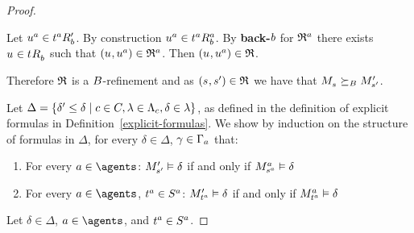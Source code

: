 \begin{proof}
\begin{description}
\begin{description}
                Let $\kStateU[\agentA] \in \kSuccessorsPB{\kStateT[\agentA]}$.
                By construction $\kStateU[\agentA] \in \kSuccessorsB[\agentA]{\kStateT[\agentA]}$.
                By {\bf back-$\agentB$} for $\refinement^\agentA$ there exists $\kStateU \in \kSuccessorsB{\kStateT}$ such that $(\kStateU, \kStateU[\agentA]) \in \refinement^\agentA$.
                Then $(\kStateU, \kStateU[\agentA]) \in \refinement$.
        \end{description}
\end{description}

Therefore $\refinement$ is a $\agentsB$-refinement and as $(\kStateS, \kStateSP) \in \refinement$ we have that $\kPModel{\kStateS} \simulatesBs \kPModelP{\kStateSP}$.

Let $\Delta = \{\delta' \leq \delta \mid \agentC \in \agentsC, \lambda \in \Lambda_\agentC, \delta \in \lambda\}$, as defined in the definition of explicit formulas in Definition~\ref{explicit-formulas}.
We show by induction on the structure of formulas in $\Delta$, for every $\delta \in \Delta$, $\gamma \in \Gamma_\agentA$ that:
\begin{enumerate}
    \item For every $\agentA \in \agents$: $\kPModelP{\kStateSP} \entails \delta$ if and only if $\kPModel[\agentA]{\kStateS[\agentA]} \entails \delta$
    \item For every $\agentA \in \agents$, $\kStateT[\agentA] \in \kStates[\agentA]$: $\kPModelP{\kStateT[\agentA]} \entails \delta$ if and only if $\kPModel[\agentA]{\kStateT[\agentA]} \entails \delta$
\end{enumerate}

Let $\delta \in \Delta$, $\agentA \in \agents$, and $\kStateT[\agentA] \in \kStates[\agentA]$.


\end{proof}
